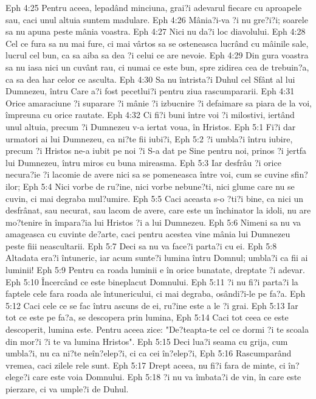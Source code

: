 Eph 4:25  Pentru aceea, lepadând minciuna, grai?i adevarul fiecare cu aproapele sau, caci unul altuia suntem madulare.
Eph 4:26  Mânia?i-va ?i nu gre?i?i; soarele sa nu apuna peste mânia voastra.
Eph 4:27  Nici nu da?i loc diavolului.
Eph 4:28  Cel ce fura sa nu mai fure, ci mai vârtos sa se osteneasca lucrând cu mâinile sale, lucrul cel bun, ca sa aiba sa dea ?i celui ce are nevoie.
Eph 4:29  Din gura voastra sa nu iasa nici un cuvânt rau, ci numai ce este bun, spre zidirea cea de trebuin?a, ca sa dea har celor ce asculta.
Eph 4:30  Sa nu întrista?i Duhul cel Sfânt al lui Dumnezeu, întru Care a?i fost pecetlui?i pentru ziua rascumpararii.
Eph 4:31  Orice amaraciune ?i suparare ?i mânie ?i izbucnire ?i defaimare sa piara de la voi, împreuna cu orice rautate.
Eph 4:32  Ci fi?i buni între voi ?i milostivi, iertând unul altuia, precum ?i Dumnezeu v-a iertat voua, în Hristos.
Eph 5:1  Fi?i dar urmatori ai lui Dumnezeu, ca ni?te fii iubi?i,
Eph 5:2  ?i umbla?i întru iubire, precum ?i Hristos ne-a iubit pe noi ?i S-a dat pe Sine pentru noi, prinos ?i jertfa lui Dumnezeu, întru miros cu buna mireasma.
Eph 5:3  Iar desfrâu ?i orice necura?ie ?i lacomie de avere nici sa se pomeneasca între voi, cum se cuvine sfin?ilor;
Eph 5:4  Nici vorbe de ru?ine, nici vorbe nebune?ti, nici glume care nu se cuvin, ci mai degraba mul?umire.
Eph 5:5  Caci aceasta s-o ?ti?i bine, ca nici un desfrânat, sau necurat, sau lacom de avere, care este un închinator la idoli, nu are mo?tenire în împara?ia lui Hristos ?i a lui Dumnezeu.
Eph 5:6  Nimeni sa nu va amageasca cu cuvinte de?arte, caci pentru acestea vine mânia lui Dumnezeu peste fiii neascultarii.
Eph 5:7  Deci sa nu va face?i parta?i cu ei.
Eph 5:8  Altadata era?i întuneric, iar acum sunte?i lumina întru Domnul; umbla?i ca fii ai luminii!
Eph 5:9  Pentru ca roada luminii e în orice bunatate, dreptate ?i adevar.
Eph 5:10  Încercând ce este bineplacut Domnului.
Eph 5:11  ?i nu fi?i parta?i la faptele cele fara roada ale întunericului, ci mai degraba, osândi?i-le pe fa?a.
Eph 5:12  Caci cele ce se fac întru ascuns de ei, ru?ine este a le ?i grai.
Eph 5:13  Iar tot ce este pe fa?a, se descopera prin lumina,
Eph 5:14  Caci tot ceea ce este descoperit, lumina este. Pentru aceea zice: "De?teapta-te cel ce dormi ?i te scoala din mor?i ?i te va lumina Hristos".
Eph 5:15  Deci lua?i seama cu grija, cum umbla?i, nu ca ni?te neîn?elep?i, ci ca cei în?elep?i,
Eph 5:16  Rascumparând vremea, caci zilele rele sunt.
Eph 5:17  Drept aceea, nu fi?i fara de minte, ci în?elege?i care este voia Domnului.
Eph 5:18  ?i nu va îmbata?i de vin, în care este pierzare, ci va umple?i de Duhul.
